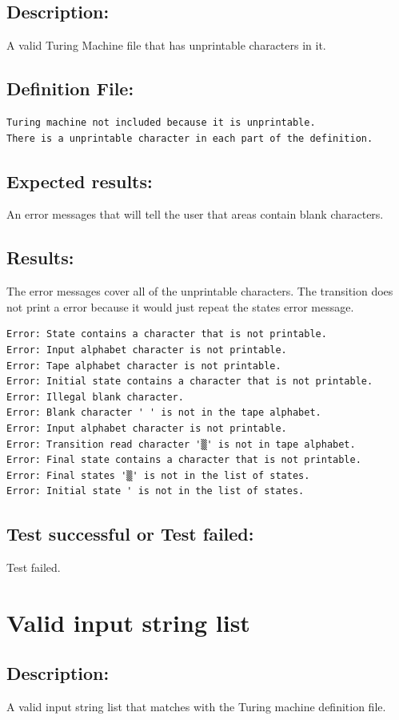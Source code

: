 \documentclass{report}
\begin{document}
\section{Description:} A valid Turing Machine file that has unprintable characters in it.

\section{Definition File: }
\begin{verbatim}
Turing machine not included because it is unprintable.
There is a unprintable character in each part of the definition.
\end{verbatim}
\section{Expected results:} An error messages that will tell the user that areas contain blank characters. 
\section{Results:} 
 The error messages cover all of the unprintable characters. The transition does not print a error because it would just repeat the states error message.
\begin{verbatim}
Error: State contains a character that is not printable.
Error: Input alphabet character is not printable.
Error: Tape alphabet character is not printable.
Error: Initial state contains a character that is not printable.
Error: Illegal blank character.
Error: Blank character ' ' is not in the tape alphabet.
Error: Input alphabet character is not printable.
Error: Transition read character '▒' is not in tape alphabet.
Error: Final state contains a character that is not printable.
Error: Final states '▒' is not in the list of states.
Error: Initial state ' is not in the list of states.
\end{verbatim}
\section{Test successful or Test failed:} Test failed.

\pagebreak


\chapter{Valid input string list}
     
\section{Description:} A valid input string list that matches with the Turing machine definition file.
\end{document}
